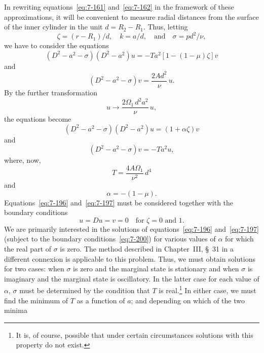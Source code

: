 In rewriting equations~\eqref{eq:7-161} and~\eqref{eq:7-162} in the framework of these
approximations, it will be convenient to measure radial distances from the
surface of the inner cylinder in the unit $d = R_2-R_1$.  Thus, letting
\begin{equation}
\label{eq:7-192}
\zeta = (r-R_1)/d, \quad k = a/d, \quad \text{and} \quad
\sigma = pd^2/\nu,
\end{equation}
we have to consider the equations
\begin{equation}
\label{eq:7-193}
(D^2-a^2-\sigma)(D^2-a^2)u = -Ta^2[1-(1-\mu)\zeta]v
\end{equation}
and
\begin{equation}
\label{eq:7-194}
(D^2-a^2-\sigma)v = \frac{2Ad^2}{\nu}\,u.
\end{equation}
By the further transformation
\begin{equation}
\label{eq:7-195}
u \to \frac{2\Omega_1\,d^2 a^2}{\nu}\,u,
\end{equation}
the equations become
\begin{equation}
\label{eq:7-196}
(D^2-a^2-\sigma)(D^2-a^2)u = (1+\alpha\zeta)v
\end{equation}
and
\begin{equation}
\label{eq:7-197}
(D^2-a^2-\sigma)v = -Ta^2 u,
\end{equation}
where, now,
\begin{equation}
\label{eq:7-198}
T = \frac{4A\Omega_1}{\nu^2}\,d^4
\end{equation}
and
\begin{equation}
\label{eq:7-199}
\alpha = -(1-\mu).
\end{equation}
Equations~\eqref{eq:7-196} and~\eqref{eq:7-197} must be considered together with the boundary
conditions
\begin{equation}
\label{eq:7-200}
u = Du = v = 0 \quad \text{for } \zeta = 0 \text{ and } 1.
\end{equation}
We are primarily interested in the solutions of equations~\eqref{eq:7-196} and~\eqref{eq:7-197} (subject to the boundary conditions~\eqref{eq:7-200}) for various values of $\alpha$
for which the real part of $\sigma$ is zero.  The method described in Chapter~III,
\S~31 in a different connexion is applicable to this problem.  Thus, we
must obtain solutions for two cases: when $\sigma$ is zero and the marginal
state is stationary and when $\sigma$ is imaginary and the marginal state is
oscillatory.  In the latter case for each value of $\alpha$, $\sigma$ must be determined
by the condition that $T$ is real.\footnote{It is, of course, possible that under certain circumstances solutions with this property
do not exist.}  In either case, we must find the minimum of $T$ as a function of $a$; and depending on which of the two minima
